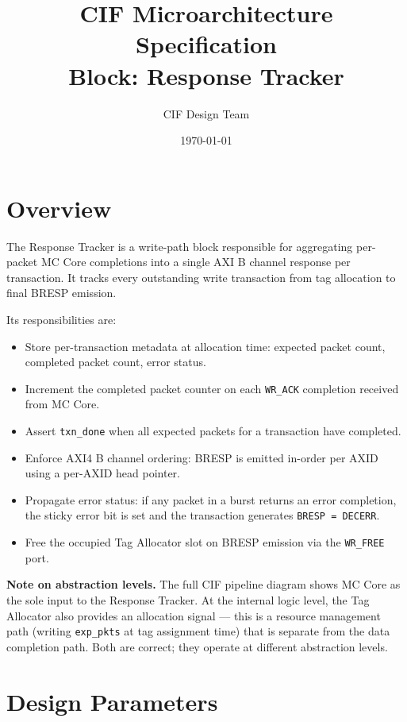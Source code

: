 \documentclass[11pt,a4paper]{article}
\title{\textbf{CIF Microarchitecture Specification}\\[0.4em]
\large Block: Response Tracker}
\author{CIF Design Team}
\date{\today}
\begin{document}
\maketitle
\thispagestyle{fancy}
\tableofcontents
\newpage

\section{Overview}

The Response Tracker is a write-path block responsible for aggregating
per-packet MC Core completions into a single AXI B channel response per
transaction. It tracks every outstanding write transaction from tag
allocation to final BRESP emission.

Its responsibilities are:
\begin{itemize}
  \item Store per-transaction metadata at allocation time: expected
        packet count, completed packet count, error status.
  \item Increment the completed packet counter on each \texttt{WR\_ACK}
        completion received from MC Core.
  \item Assert \texttt{txn\_done} when all expected packets for a
        transaction have completed.
  \item Enforce AXI4 B channel ordering: BRESP is emitted in-order per
        AXID using a per-AXID head pointer.
  \item Propagate error status: if any packet in a burst returns an
        error completion, the sticky error bit is set and the
        transaction generates \texttt{BRESP = DECERR}.
  \item Free the occupied Tag Allocator slot on BRESP emission via the
        \texttt{WR\_FREE} port.
\end{itemize}

\textbf{Note on abstraction levels.} The full CIF pipeline diagram
shows MC Core as the sole input to the Response Tracker. At the
internal logic level, the Tag Allocator also provides an allocation
signal — this is a resource management path (writing \texttt{exp\_pkts}
at tag assignment time) that is separate from the data completion path.
Both are correct; they operate at different abstraction levels.

\section{Design Parameters}
\end{document}
